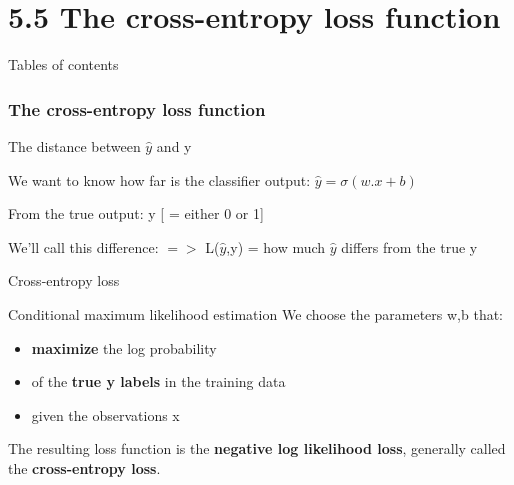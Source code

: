\documentclass[13.5pt,aspecratio=169]{beamer}
\begin{document}
\section{5.5 The cross-entropy loss function}

\begin{frame}{Tables of contents}
    \tableofcontents[currentsection]
\end{frame}

\begin{frame}
    \frametitle{The cross-entropy loss function}
    {\Large The distance between $\hat{y}$ and y}
    \bigskip
    \begin{block}{We want to know how far is the classifier output:}
        {\hphantom{xyz}  $\hat{y} = \sigma(w.x+b)$ }

    \end{block}

    \begin{block}{From the true output:}
        {\hphantom{xyz} y     [ = either 0 or 1]} 
    \end{block}
    \begin{block}{ We'll call this difference:}
        $=>$ L($\hat{y}$,y) = how much $\hat{y}$ differs from the true y 
    \end{block}
\end{frame}
\begin{frame}{Cross-entropy loss}
    \begin{block}{\Large Conditional maximum likelihood estimation}
        We choose the parameters w,b that: 
        \begin{itemize}
            \item \textbf{maximize} the log probability 
            \item of the \textbf{true y labels} in the training data 
            \item  given the observations x
        \end{itemize}
    \end{block}
    \begin{exampleblock}{}
         The resulting loss function is the \textbf{ negative log likelihood loss}, generally called the \textbf{cross-entropy loss}.
    \end{exampleblock}
\end{frame}
\end{document}

